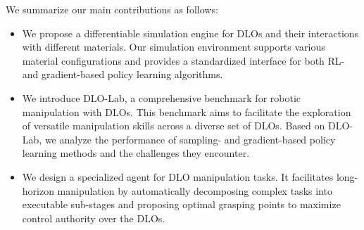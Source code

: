\begin{table}[t]
\begin{center}
\caption{\textbf{Comparison with existing simulators for DLOs.} ``NN'' refers to neural networks. ``DER'' refers to the Discrete Elastic Rods~\citep{bergou2008discrete,bergou2010discrete} theory. ``Coupling'' refers to interaction between DLOs and other materials (\eg, rigid or soft bodies).}
\label{tab:feature-comparison}
\end{center}
\vspace{-6mm}
\end{table}

We summarize our main contributions as follows:
\begin{itemize}[align=right,itemindent=0em,labelsep=2pt,labelwidth=1em,leftmargin=*,itemsep=0em] 
    \item We propose a differentiable simulation engine for DLOs and their interactions with different materials. Our simulation environment supports various material configurations and provides a standardized interface for both RL- and gradient-based policy learning algorithms.
    \item We introduce DLO-Lab, a comprehensive benchmark for robotic manipulation with DLOs. This benchmark aims to facilitate the exploration of versatile manipulation skills across a diverse set of DLOs. Based on DLO-Lab, we analyze the performance of sampling- and gradient-based policy learning methods and the challenges they encounter.
    \item We design a specialized agent for DLO manipulation tasks. It facilitates long-horizon manipulation by automatically decomposing complex tasks into executable sub-stages and proposing optimal grasping points to maximize control authority over the DLOs.
\end{itemize}
